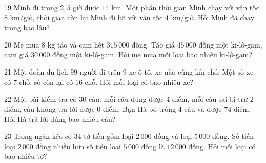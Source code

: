 \gap
\begin{probbox}{19}{\relax}
Minh đi trong $2{,}5$ giờ được $14$ km. Một phần thời gian Minh chạy với vận tốc $8$ km/giờ, thời gian còn lại Minh đi bộ với vận tốc $4$ km/giờ. Hỏi Minh đã chạy trong bao lâu?
\end{probbox}
\gap
\begin{probbox}{20}{\relax}
Mẹ mua $8$ kg táo và cam hết $315\,000$ đồng. Táo giá $45\,000$ đồng một ki-lô-gam, cam giá $30\,000$ đồng một ki-lô-gam. Hỏi mẹ mua mỗi loại bao nhiêu ki-lô-gam?
\end{probbox}
\gap
\begin{probbox}{21}{\relax}
Một đoàn du lịch $99$ người đi trên $9$ xe ô tô, xe nào cũng kín chỗ. Một số xe có $7$ chỗ, số còn lại có $16$ chỗ. Hỏi mỗi loại có bao nhiêu xe?
\end{probbox}
\gap
\begin{probbox}{22}{\relax}
Một bài kiểm tra có $30$ câu: mỗi câu đúng được $4$ điểm, mỗi câu sai bị trừ $2$ điểm, câu không trả lời được $0$ điểm. Bạn Hà bỏ trống $4$ câu và được $74$ điểm. Hỏi Hà trả lời đúng bao nhiêu câu?
\end{probbox}
\gap
\begin{probbox}{23}{\relax}
Trong ngăn kéo có $34$ tờ tiền gồm loại $2\,000$ đồng và loại $5\,000$ đồng. Số tiền loại $2\,000$ đồng nhiều hơn số tiền loại $5\,000$ đồng là $12\,000$ đồng. Hỏi mỗi loại có bao nhiêu tờ?
\end{probbox}

